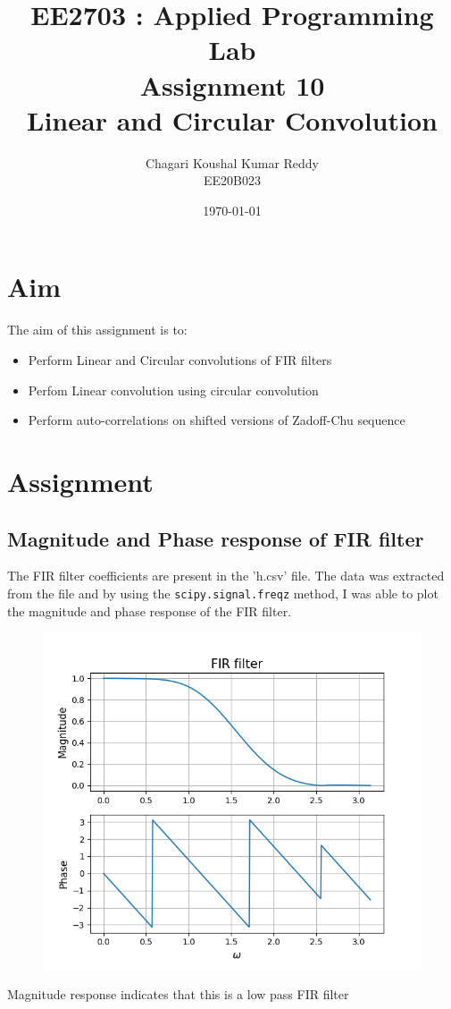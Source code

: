 \documentclass[12pt, a4paper]{article}
\title{\textbf{EE2703 : Applied Programming Lab \\ Assignment 10 \\ Linear and Circular Convolution}}
\author{Chagari Koushal Kumar Reddy \\ EE20B023} %
\date{\today} %
\begin{document}
		

\maketitle %
\clearpage

\tableofcontents
\clearpage

\section{Aim}
The aim of this assignment is to:
\begin{itemize}
    \item Perform Linear and Circular convolutions of FIR filters
    \item Perfom Linear convolution using circular convolution
    \item Perform auto-correlations on shifted versions of Zadoff-Chu sequence
\end{itemize}
\section{Assignment}
\subsection{Magnitude and Phase response of FIR filter}
The FIR filter coefficients are present in the 'h.csv' file. The data was extracted from the file and by using the \texttt{scipy.signal.freqz} method, I was able to plot the magnitude and phase response of the FIR filter.
\begin{figure}[H]
    \centering
    \includegraphics[scale = 0.8]{Figure_1.png}
    \label{fig:sample}
\end{figure}
\begin{center}
    Magnitude response indicates that this is a low pass FIR filter
\end{center}
\end{document}

